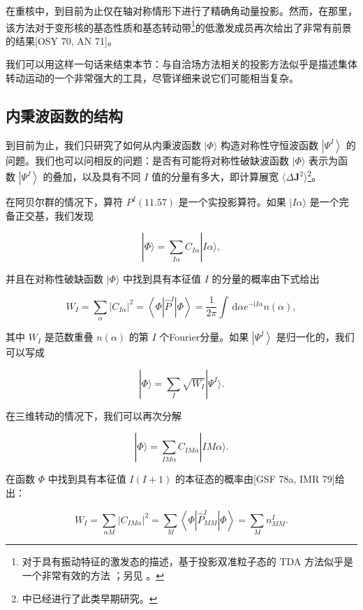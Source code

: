 在重核中，到目前为止仅在轴对称情形下进行了精确角动量投影。然而，在那里，该方法对于变形核的基态性质和基态转动带\footnote{对于具有振动特征的激发态的描述，基于投影双准粒子态的 TDA 方法似乎是一个非常有效的方法 \cite{OS69,Kl70,AG74,HIT79}；另见
\cite{SZ79}。}的低激发成员再次给出了非常有前景的结果{[}OSY 70, AN 71{]}。

我们可以用这样一句话来结束本节：与自洽场方法相关的投影方法似乎是描述集体转动运动的一个非常强大的工具，尽管详细来说它们可能相当复杂。

\subsection{内秉波函数的结构}

到目前为止，我们只研究了如何从内秉波函数 $|\Phi\rangle$ 构造对称性守恒波函数 $\left|{\Psi}^{I}\right\rangle $
的问题。我们也可以问相反的问题：是否有可能将对称性破缺波函数 $|\Phi\rangle$ 表示为函数 $\left|{\Psi}^{I}\right\rangle $
的叠加，以及具有不同 $I$ 值的分量有多大，即计算展宽 $\langle\Delta\boldsymbol{J}^{2}\rangle$\footnote{\cite{AY59} 中已经进行了此类早期研究。}。

在阿贝尔群的情况下，算符 ${P}^{I}\left({11.57}\right)$ 是一个实投影算符。如果 $|{I\alpha}\rangle$
是一个完备正交基，我们发现

\[
|\Phi\rangle=\mathop{\sum}\limits_{{I\alpha}}{C}_{I\alpha}|{I\alpha}\rangle,\tag{11.146}
\]

并且在对称性破缺函数 $|\Phi\rangle$ 中找到具有本征值 $I$ 的分量的概率由下式给出

\[
{W}_{I}=\mathop{\sum}\limits_{\alpha}{\left|{C}_{I\alpha}\right|}^{2}=\left\langle {\Phi\left|{\widehat{P}}^{I}\right|\Phi}\right\rangle =\frac{1}{2\pi}\int{\,\mathrm{d}\alpha}{e}^{-{\mathrm{i}I\alpha}}n\left(\alpha\right),\tag{11.147}
\]

其中 ${W}_{I}$ 是范数重叠 $n\left(\alpha\right)$ 的第 $I$ 个Fourier分量。如果
$\left|{\Psi}^{I}\right\rangle $ 是归一化的，我们可以写成

\[
|\Phi\rangle=\mathop{\sum}\limits_{I}\sqrt{{W}_{I}}|{\Psi}^{I}\rangle.\tag{11.148}
\]

在三维转动的情况下，我们可以再次分解

\[
|\Phi\rangle=\mathop{\sum}\limits_{{IM\alpha}}{C}_{IM\alpha}|{IM\alpha}\rangle.\tag{11.149}
\]

在函数 $\Phi$ 中找到具有本征值 $I\left({I+1}\right)$ 的本征态的概率由{[}GSF 78a, IMR
79{]}给出：

\[
{W}_{I}=\mathop{\sum}\limits_{{\alpha M}}{\left|{C}_{IM\alpha}\right|}^{2}=\mathop{\sum}\limits_{M}\left\langle {\Phi\left|{\widehat{P}}^{I}_{MM}\right|\Phi}\right\rangle =\mathop{\sum}\limits_{M}{n}^{I}_{MM}.\tag{11.150}
\]

